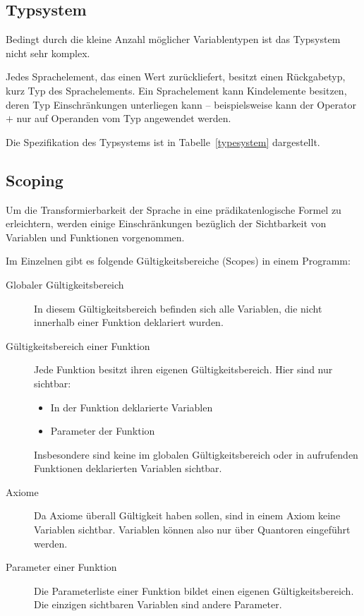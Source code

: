\subsection{Typsystem}

Bedingt durch die kleine Anzahl möglicher Variablentypen ist das Typsystem nicht sehr komplex.

Jedes Sprachelement, das einen Wert zurückliefert, besitzt einen Rückgabetyp, kurz Typ des Sprachelements. Ein Sprachelement kann Kindelemente besitzen, deren Typ Einschränkungen unterliegen kann -- beispielsweise kann der Operator $+$ nur auf Operanden vom Typ \int{} angewendet werden.

Die Spezifikation des Typsystems ist in Tabelle~\ref{typesystem} dargestellt.

\subsection{Scoping}

Um die Transformierbarkeit der Sprache in eine prädikatenlogische Formel zu erleichtern, werden einige Einschränkungen bezüglich der Sichtbarkeit von Variablen und Funktionen vorgenommen.

Im Einzelnen gibt es folgende Gültigkeitsbereiche (Scopes) in einem Programm:

\begin{description}
	\item[Globaler Gültigkeitsbereich] In diesem Gültigkeitsbereich befinden sich alle Variablen, die nicht innerhalb einer Funktion deklariert wurden.
	\item[Gültigkeitsbereich einer Funktion] Jede Funktion besitzt ihren eigenen Gültigkeitsbereich. Hier sind nur sichtbar: \begin{itemize}
		\item In der Funktion deklarierte Variablen
		\item Parameter der Funktion
	\end{itemize}
	Insbesondere sind keine im globalen Gültigkeitsbereich oder in aufrufenden Funktionen deklarierten Variablen sichtbar.
	\item[Axiome] Da Axiome überall Gültigkeit haben sollen, sind in einem Axiom keine Variablen sichtbar. Variablen können also nur über Quantoren eingeführt werden.
	\item[Parameter einer Funktion] Die Parameterliste einer Funktion bildet einen eigenen Gültigkeitsbereich. Die einzigen sichtbaren Variablen sind andere Parameter.
\end{description}



